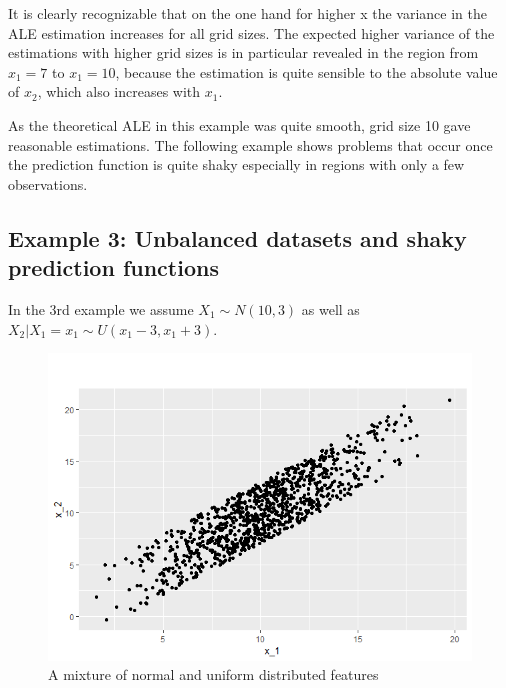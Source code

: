 \documentclass[
]{krantz}
\begin{document}
It is clearly recognizable that on the one hand for higher x the variance in the ALE estimation increases for all grid sizes. The expected higher variance of the estimations with higher grid sizes is in particular revealed in the region from \(x_1 = 7\) to \(x_1 = 10\), because the estimation is quite sensible to the absolute value of \(x_2\), which also increases with \(x_1\).

As the theoretical ALE in this example was quite smooth, grid size 10 gave reasonable estimations. The following example shows problems that occur once the prediction function is quite shaky especially in regions with only a few observations.

\hypertarget{example-3-unbalanced-datasets-and-shaky-prediction-functions}{%
\subsection{Example 3: Unbalanced datasets and shaky prediction functions}\label{example-3-unbalanced-datasets-and-shaky-prediction-functions}}

In the 3rd example we assume \(X_1 \sim N(10,3)\) as well as\\
\(X_2 \vert X_1 = x_1 \sim U(x_1 - 3, x_1 + 3 )\).

\begin{figure}
\includegraphics[width=1\linewidth]{images/ALE_2_dataset2_} \caption{A mixture of normal and uniform distributed features}\label{fig:datasetALE2}
\end{figure}
\end{document}
